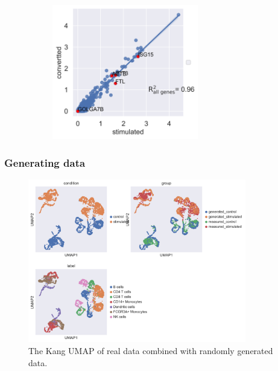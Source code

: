 \documentclass[final]{beamer}
\theoremstyle{plain}
\theoremstyle{definition}
\theoremstyle{remark}
\begin{document}
\begin{frame}
\begin{figure}[h]
\begin{subfigure}[b]{0.49\textwidth}
\includegraphics[width=0.7\textwidth]{images/Kang_bcells_stimulated_converted.png}
\label{fig:Kang_bcells_stimulated_converted}
\end{subfigure}
\end{figure}
\end{frame}

\begin{frame}
\frametitle{Generating data}
\begin{figure}[h]
\centering
\includegraphics[width=0.85\textwidth]{images/Kang_generated_data.png}
\caption{
The Kang UMAP of real data combined with randomly generated data.
}
\label{fig:Kang_generated_data}
\end{figure}
\end{frame}
\end{document}
